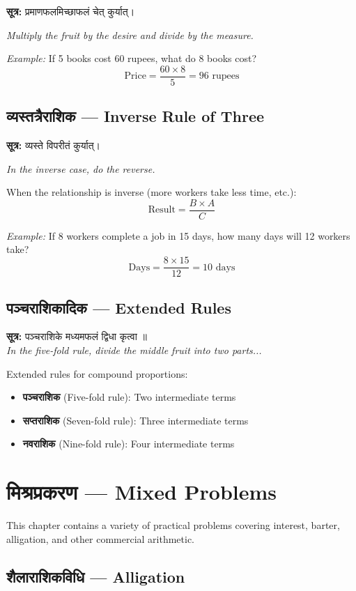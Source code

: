 \documentclass[10pt,a4paper]{article}
\newenvironment{sanskritverse}{%
  \begin{center}%
  \begin{minipage}{0.94\textwidth}%
  \centering\devanagarifont\small%
}{%
  \end{minipage}%
  \end{center}%
  \vspace{0.1em}%
}
\newcommand{\sutratxt}[2]{%
  \begin{center}%
  \colorbox{sanskritbg}{%
    \begin{minipage}{0.93\textwidth}%
    \centering\small\vspace{3pt}%
    {\devanagarifont\textbf{सूत्र:} #1}\par\vspace{2pt}%
    \textit{#2}\vspace{3pt}%
    \end{minipage}%
  }%
  \end{center}%
  \vspace{0.1em}%
}
\begin{document}
\sutratxt{प्रमाणफलमिच्छाफलं चेत् कुर्यात्।}{Multiply the fruit by the desire and divide by the measure.}

\textit{Example:} If 5 books cost 60 rupees, what do 8 books cost?
\[
\text{Price} = \frac{60 \times 8}{5} = 96 \text{ rupees}
\]

\subsection{व्यस्तत्रैराशिक — Inverse Rule of Three}

\sutratxt{व्यस्ते विपरीतं कुर्यात्।}{In the inverse case, do the reverse.}

When the relationship is inverse (more workers take less time, etc.):
\[
\text{Result} = \frac{B \times A}{C}
\]

\textit{Example:} If 8 workers complete a job in 15 days, how many days will 12 workers take?
\[
\text{Days} = \frac{8 \times 15}{12} = 10 \text{ days}
\]

\subsection{पञ्चराशिकादिक — Extended Rules}

\begin{sanskritverse}
\textbf{सूत्र:} पञ्चराशिके मध्यमफलं द्विधा कृत्वा ॥\\
\textit{In the five-fold rule, divide the middle fruit into two parts...}
\end{sanskritverse}

Extended rules for compound proportions:
\begin{itemize}[itemsep=0pt]
\item \textbf{पञ्चराशिक} (Five-fold rule): Two intermediate terms
\item \textbf{सप्तराशिक} (Seven-fold rule): Three intermediate terms
\item \textbf{नवराशिक} (Nine-fold rule): Four intermediate terms
\end{itemize}

\section{मिश्रप्रकरण — Mixed Problems}
\label{sec:mishra}

This chapter contains a variety of practical problems covering interest, barter, alligation, and other commercial arithmetic.

\subsection{शैलाराशिकविधि — Alligation}
\end{document}
